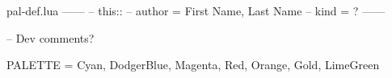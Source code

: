 
%
%
%
%

\begin{filecontents*}[overwrite]{pal-def.lua}
------
-- this::
--     author = First Name, Last Name
--     kind   = ?
------

-- Dev comments?

PALETTE = {
   Cyan,
   DodgerBlue,
   Magenta,
   Red,
   Orange,
   Gold,
   LimeGreen
}
\end{filecontents*}



\documentclass[theme = dark]{tutodoc}

\geometry{
  landscape,
  twocolumn,
  top  = .75cm, bottom = .75cm,
  left = .75cm, right  = .75cm
}

\usepackage[dvipsnames, svgnames, x11names]{xcolor}
\usepackage[3d]{luadraw}








\section*{Your palette definition}



\section*{Use cases}

\begin{luacode*}
PALSIZE = #PALETTE

PALDIM   = 1
PALDELTA = .3

xmin, xmax = -100, 100

COL_1 = "lightgray!95"
COL_2 = "lightgray!20!black"
\end{luacode*}





